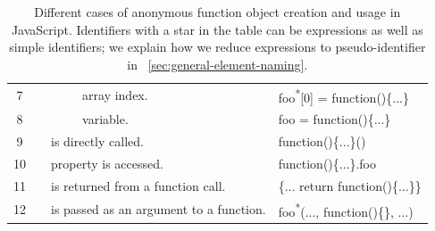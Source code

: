 \documentclass[10pt, preprint]{sigplanconf}
\begin{document}
\begin{table}
{\begin{tabular}{ | c | l | l | l | m{2.5cm} | l|}
   7 &
   &
   & \multicolumn{2}{|l|}{
      array index.}
   & foo\textsuperscript{*}[0] = function()\{...\} \\
   \cline{0-0}\cline{4-6} 

   8 &
   & 
   & \multicolumn{2}{|l|}{
      variable.}
   & foo = function()\{...\} \\
   \cline{0-0}\cline{3-6} 
   
   9 &
   & \multicolumn{3}{|m{3.8cm}|}{
     \raggedright is directly called.}
   & function()\{...\}() \\
   \cline{0-0}\cline{3-6} 

   10 &
   & \multicolumn{3}{|m{3.8cm}|}{
     \raggedright property is accessed.}
   & function()\{...\}.foo \\
   \cline{0-0}\cline{3-6} 

   11 &
   & \multicolumn{3}{|m{3.5cm}|}{
     \raggedright is returned from a function call.}
   & \{... return function()\{...\}\} \\
   \cline{0-0}\cline{3-6} 

   12 &
   & \multicolumn{3}{|m{3.5cm}|}{
     \raggedright is passed as an argument to a function.}
   & foo\textsuperscript{*}(..., function()\{\}, ...) \\
   \hline 

  \end{tabular}
    }
\caption{Different cases of anonymous function object creation and usage in JavaScript.  Identifiers with a star in the table can be expressions as well as simple identifiers; we explain how we reduce expressions to pseudo-identifier in ~\ref{sec:general-element-naming}.}
\label{table:function-types} 
\end{table}
\end{document}
